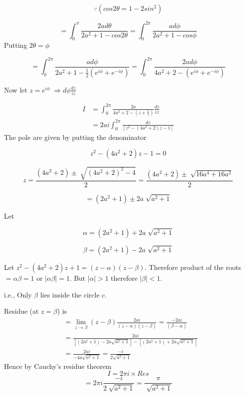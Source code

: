 \[
\because(cos2\theta=1-2sin^{2})\]


\[
=\int_{0}^{\pi}\frac{2ad\theta}{2a^{2}+1-cos2\theta}=\int_{0}^{2\pi}\frac{ad\phi}{2a^{2}+1-cos\phi}\]
Putting $2\theta=\phi$

\[
=\int_{0}^{2\pi}\frac{ad\phi}{2a^{2}+1-\frac{1}{2}(e^{i\phi}+e^{-i\phi})}=\int_{0}^{2\pi}\frac{2ad\phi}{4a^{2}+2-(e^{i\phi}+e^{-i\phi})}\]


Now let $z=e^{i\phi}\;\Rightarrow d\phi\frac{dz}{iz}$

\begin{align*}
I & =\int_{0}^{2\pi}\frac{2a}{4a^{2}+2-(z+\frac{1}{z})}\frac{dz}{iz}\\
 & =2ai\int_{0}^{2\pi}\frac{dz}{\left[z^{2}-(4a^{2}+2)z-1\right]}\end{align*}
The pole are given by putting the denominator

\[
z^{2}-(4a^{2}+2)z-1=0\]


\[
z=\frac{(4a^{2}+2)\pm\sqrt[]{(4a^{2}+2)^{2}-4}}{2}=\frac{(4a^{2}+2)\pm\sqrt[]{16a^{4}+16a^{2}}}{2}\]


\[
=(2a^{2}+1)\pm2a\sqrt[]{a^{2}+1}\]


Let

\[
\alpha=(2a^{2}+1)+2a\sqrt[]{a^{2}+1}\]


\[
\beta=(2a^{2}+1)-2a\sqrt[]{a^{2}+1}\]


Let $z^{2}-(4a^{2}+2)z+1=(z-\alpha)(z-\beta)$. Therefore product
of the roots $=\alpha\beta=1$ or $|\alpha\beta|=1$. But $|\alpha|>1$
therefore $|\beta|<1$.

i.e., Only $\beta$ lies inside the circle $c$.

Residue (at $z=\beta$) is \begin{align*}
 & =\lim_{z\rightarrow\beta}(z-\beta)\frac{2ai}{(z-\alpha)(z-\beta)} =\frac{-2ai}{(\beta-\alpha)}\\
 & =\frac{2ai}{\left[(2a^{2}+1)-2a\sqrt{a^{2}+1}\right]-\left[(2a^{2}+1)+2a\sqrt{a^{2}+1}\right]}\\
 & =\frac{2ai}{-4a\sqrt{a^{2}+1}}=\frac{-i}{2\sqrt{a^{2}+1}}
\end{align*}
Hence by Cauchy's residue theorem
\[I=2\pi i\times Res\]
\[
=2\pi i\frac{-i}{2\sqrt[]{a^{2}+1}}=\frac{\pi}{\sqrt[]{a^{2}+1}}\]

